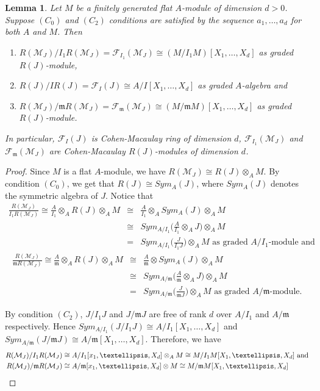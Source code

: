 \documentclass[11pt,reqno]{amsart}
\newtheorem{lemma}[theorem]{Lemma}
\theoremstyle{definition}
\newcommand{\m}{\mathfrak m}
\def\F{{\mathcal F}}
\def\M{{\mathcal M}}
\numberwithin{equation}{section}
\begin{document}
\begin{lemma}\label{lemma-2.2(a)}
	Let $M$ be a finitely generated flat $A$-module of dimension $d>0$. Suppose $(C_0)$ and $(C_2)$ conditions are satisfied by the sequence $a_1,\ldots,a_d$ for both $A$ and $M$. Then 
    \begin{enumerate}
        \item $R(\M_J)/I_1R(\M_J)=\F_{I_1}(\M_J)\cong (M/I_1M)[X_1,\ldots,X_d]$ as graded $R(J)$-module,
        \item $R(J)/IR(J)=\F_I(J) \cong A/I[X_1,\ldots,X_d]$ as graded $A$-algebra and 
        \item $R(\M_J)/\m R(\M_J)=\F_{\m}(\M_J)\cong (M/\m M)[X_1,\ldots,X_d]$ as graded $R(J)$-module. 	
    \end{enumerate}  
	In particular, $\F_I(J)$ is Cohen-Macaulay ring of dimension $d$, $\F_{I_1}(\M_J)$ and  $\F_\m(\M_J)$ are Cohen-Macaulay $R(J)$-modules of dimension $d$.
\end{lemma}
\begin{proof}
    Since $M$ is a flat $A$-module, we have $R(\M_J)\cong R(J) \otimes_A M.$ By condition $(C_0)$, we get that $R(J)\cong Sym_A(J)$, where $Sym_A(J)$ denotes the symmetric algebra of $J$. Notice that 
\begin{eqnarray*}
\frac{R(\M_J)}{I_1R(\M_J)}\cong \frac{A}{I_1}\otimes_A R(J)\otimes_A M &\cong&  \frac{A}{I_1} \otimes_A Sym_A(J)\otimes_A M\\
&\cong& Sym_{A/I_1}\Big(\frac{A}{I_1} \otimes_A J\Big)\otimes_A M\\
&=&Sym_{A/I_1}\Big(\frac{J}{I_1J}\Big)\otimes_A M \text{ as graded $A/I_1$-module and } 
\end{eqnarray*}
\begin{eqnarray*}
    \frac{R(\M_J)}{\m R(\M_J)}\cong \frac{A}{\m}\otimes_A R(J)\otimes_A M &\cong&  \frac{A}{\m} \otimes Sym_A(J)\otimes_A M\\
    &\cong& Sym_{A/\m}\Big(\frac{A}{\m} \otimes_A J\Big)\otimes_A M\\&=&Sym_{A/\m}\Big(\frac{J}{\m J}\Big)\otimes_A M  \text{ as graded $A/\m$-module. }
\end{eqnarray*}

By condition $(C_2)$, $J/I_1J$ and $J/\m J$ are free  of rank $d$ over $A/I_1$ and $A/\m$ respectively. Hence $Sym_{A/I_1}(J/I_1J)\cong A/I_1[X_1,\ldots,X_d]$ and $Sym_{A/\m}(J/\m J)\cong A/\m[X_1,\ldots,X_d]$.   Therefore, we have 
\begin{align*}
R(\M_J)/I_1R(\M_J)&\cong A/I_1[x_1,\ldots,X_d]\otimes_A M \cong M/I_1M[X_1,\ldots, X_d] \text{ and }\\
R(\M_J)/\m R(\M_J)&\cong A/\m [x_1,\ldots,X_d]\otimes M \cong M/\m M[X_1,\ldots, X_d]\qedhere
\end{align*}
\end{proof}
\end{document}
